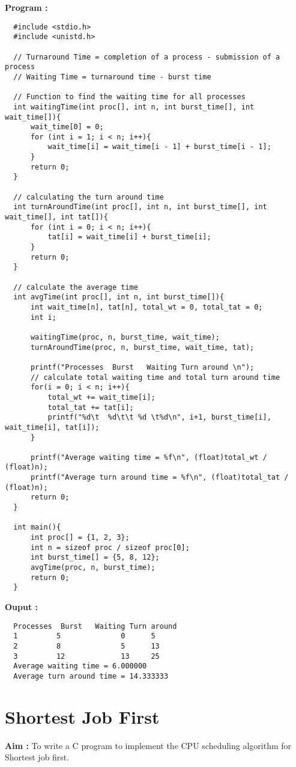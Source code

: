 \documentclass[journal,onecolumn]{IEEEtran}
\begin{document}
\textbf{Program : }
\begin{verbatim}
  #include <stdio.h>
  #include <unistd.h>
  
  // Turnaround Time = completion of a process - submission of a process
  // Waiting Time = turnaround time - burst time
  
  // Function to find the waiting time for all processes
  int waitingTime(int proc[], int n, int burst_time[], int wait_time[]){
      wait_time[0] = 0;
      for (int i = 1; i < n; i++){
          wait_time[i] = wait_time[i - 1] + burst_time[i - 1];
      }
      return 0;
  }
  
  // calculating the turn around time
  int turnAroundTime(int proc[], int n, int burst_time[], int wait_time[], int tat[]){
      for (int i = 0; i < n; i++){
          tat[i] = wait_time[i] + burst_time[i];
      }
      return 0;
  }
  
  // calculate the average time
  int avgTime(int proc[], int n, int burst_time[]){
      int wait_time[n], tat[n], total_wt = 0, total_tat = 0;
      int i;
  
      waitingTime(proc, n, burst_time, wait_time);
      turnAroundTime(proc, n, burst_time, wait_time, tat);
  
      printf("Processes  Burst   Waiting Turn around \n");
      // calculate total waiting time and total turn around time
      for(i = 0; i < n; i++){
          total_wt += wait_time[i];
          total_tat += tat[i];
          printf("%d\t  %d\t\t %d \t%d\n", i+1, burst_time[i], wait_time[i], tat[i]);
      }
  
      printf("Average waiting time = %f\n", (float)total_wt / (float)n);
      printf("Average turn around time = %f\n", (float)total_tat / (float)n);
      return 0;
  }
  
  int main(){
      int proc[] = {1, 2, 3};
      int n = sizeof proc / sizeof proc[0];
      int burst_time[] = {5, 8, 12};
      avgTime(proc, n, burst_time);
      return 0;
  }
\end{verbatim}


\textbf{Ouput :}
\begin{verbatim}
  Processes  Burst   Waiting Turn around 
  1         5              0      5
  2         8              5      13
  3         12             13     25
  Average waiting time = 6.000000
  Average turn around time = 14.333333
\end{verbatim}



\section{Shortest Job First}
\textbf{Aim : } To write a C program to implement the CPU scheduling algorithm for Shortest job first.
\end{document}
